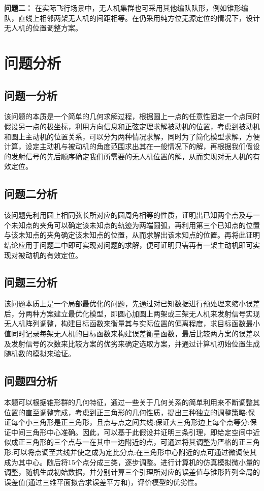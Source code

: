 \documentclass[withoutpreface,bwprint]{cumcmthesis} %
\begin{document}
\textbf{问题二：}
在实际飞行场景中，无人机集群也可采用其他编队队形，例如锥形编队，直线上相邻两架无人机的间距相等。在仍采用纯方位无源定位的情况下，设计无人机的位置调整方案。

\section{问题分析}

\subsection{问题一分析}
该问题的本质是一个简单的几何求解过程，根据圆上一点的任意性固定一个点同时假设另一点的极坐标，利用方向信息和正弦定理求解被动机的位置，考虑到被动机和圆上主动机的位置关系，可以分为两种情况求解，同时为了简化模型求解，方便计算，设定主动机与被动机的角度范围求出其在一般情况下的解，再根据我们假设的发射信号的先后顺序确定我们所需要的无人机位置的解，从而实现对无人机的有效定位。

\subsection{问题二分析}
该问题先利用圆上相同弦长所对应的圆周角相等的性质，证明出已知两个点及与一个未知点的夹角可以确定该未知点的轨迹为两端圆弧，再利用第三个已知点的位置与该未知点的夹角确定该未知点的位置，从而求解出该未知点的位置。再将此证明结论应用于问题二中即可实现对问题的求解，便可证明只需再有一架主动机即可实现对被动机的有效定位。

\subsection{问题三分析}
该问题本质上是一个局部最优化的问题，先通过对已知数据进行预处理来缩小误差后，分两种方案建立最优化模型，即圆心加圆上两架或三架无人机来发射信号实现无人机阵列调整，构建目标函数来衡量其与实际位置的偏离程度，求目标函数最小值同时记录每架无人机的目标函数来构建误差衡量函数，最后比较两方案的误差以及发射信号的次数来比较方案的优劣来确定选取方案，并通过计算机初始位置生成随机数的模拟来验证。

\subsection{问题四分析}
本题可以根据锥形群的几何特征，通过一些关于几何关系的简单利用来不断调整其位置的直至调整完成，考虑到正三角形的几何性质，提出三种独立的调整策略:保证每个小三角形是正三角形，且点与点之间共线:保证大三角形边上每个点等分:保证中间三角形中心准确。因此，可以基于此假设并证明三条引理，即给定空间中近似成正三角形的三个点与一在其中一边附近的点，可通过将其调整为严格的正三角形:可以将点调至共线并使之成为定比分点:在三角形中心附近的点可通过微调使其成为其中心。随后将15个点分成三类，逐步调整。进行计算机的仿真模拟微小量的调整，随机生成初始数据，并分别计算三个引理所对应的误差值与锥形阵列全局的误差值(通过三维平面拟合求误差平方和)，评价模型的优劣性。
\end{document}
